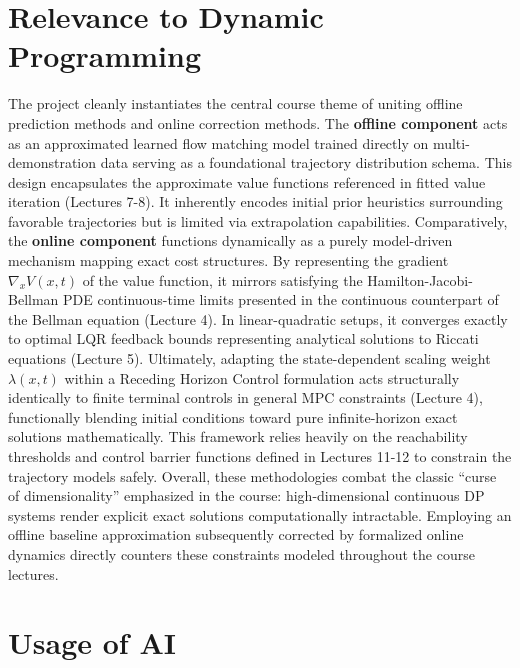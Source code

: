 \documentclass[letterpaper, 10 pt, conference]{ieeeconf}  %
\begin{document}
\section{Relevance to Dynamic Programming}


The project cleanly instantiates the central course theme of uniting offline prediction methods and online correction methods. The \textbf{offline component} acts as an approximated learned flow matching model trained directly on multi-demonstration data serving as a foundational trajectory distribution schema. This design encapsulates the approximate value functions referenced in fitted value iteration (Lectures 7-8). It inherently encodes initial prior heuristics surrounding favorable trajectories but is limited via extrapolation capabilities. Comparatively, the \textbf{online component} functions dynamically as a purely model-driven mechanism mapping exact cost structures. By representing the gradient $\nabla_x V(x, t)$ of the value function, it mirrors satisfying the Hamilton-Jacobi-Bellman PDE continuous-time limits presented in the continuous counterpart of the Bellman equation (Lecture 4). In linear-quadratic setups, it converges exactly to optimal LQR feedback bounds representing analytical solutions to Riccati equations (Lecture 5). Ultimately, adapting the state-dependent scaling weight $\lambda(x, t)$ within a Receding Horizon Control formulation acts structurally identically to finite terminal controls in general MPC constraints (Lecture 4), functionally blending initial conditions toward pure infinite-horizon exact solutions mathematically. This framework relies heavily on the reachability thresholds and control barrier functions defined in Lectures 11-12 to constrain the trajectory models safely. Overall, these methodologies combat the classic ``curse of dimensionality'' emphasized in the course: high-dimensional continuous DP systems render explicit exact solutions computationally intractable. Employing an offline baseline approximation subsequently corrected by formalized online dynamics directly counters these constraints modeled throughout the course lectures.

\section{Usage of AI}

\end{document}
